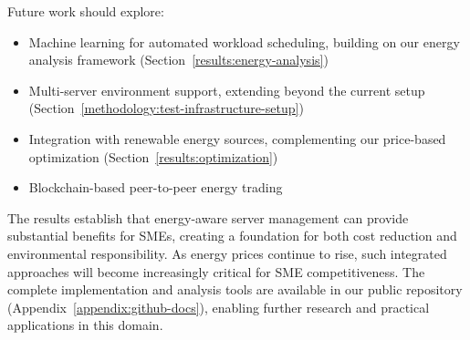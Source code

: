 Future work should explore:
\begin{itemize}
    \item Machine learning for automated workload scheduling, building on our energy analysis framework (Section~\ref{results:energy-analysis})
    \item Multi-server environment support, extending beyond the current setup (Section~\ref{methodology:test-infrastructure-setup})
    \item Integration with renewable energy sources, complementing our price-based optimization (Section~\ref{results:optimization})
    \item Blockchain-based peer-to-peer energy trading
\end{itemize}

The results establish that energy-aware server management can provide substantial benefits for SMEs, creating a foundation for both cost reduction and environmental responsibility. As energy prices continue to rise, such integrated approaches will become increasingly critical for SME competitiveness. The complete implementation and analysis tools are available in our public repository (Appendix~\ref{appendix:github-docs}), enabling further research and practical applications in this domain.